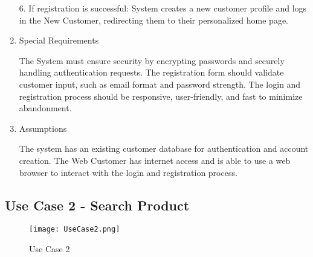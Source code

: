 \documentclass[conference]{IEEEtran}
\begin{document}
\begin{enumerate}
6. If registration is successful:
System creates a new customer profile and logs in the New Customer, redirecting them to their personalized home page.

\item Special Requirements

The System must ensure security by encrypting passwords and securely handling authentication requests.
The registration form should validate customer input, such as email format and password strength.
The login and registration process should be responsive, user-friendly, and fast to minimize abandonment.

\item Assumptions

The system has an existing customer database for authentication and account creation.
The Web Customer has internet access and is able to use a web browser to interact with the login and registration process.

\end{enumerate}

\subsection{Use Case 2 - Search Product}

\begin{figure}[H]
    \centering
    \texttt{[image: UseCase2.png]}
    \caption{Use Case 2}
    \label{fig:use-case-2}
\end{figure}
\end{document}
